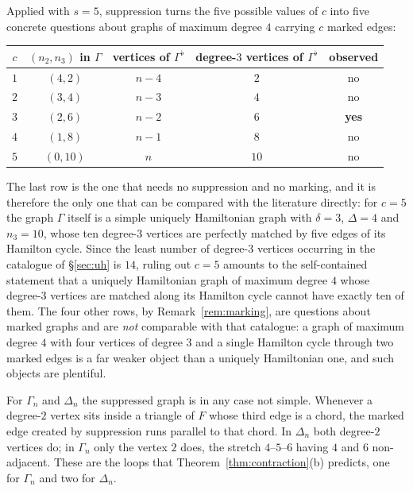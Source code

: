 \documentclass[11pt,a4paper]{article}
\theoremstyle{definition}
\theoremstyle{remark}
\begin{document}
Applied with $s=5$, suppression turns the five possible values of $c$ into five concrete questions about graphs of maximum degree $4$ carrying $c$ marked edges:
\begin{center}
\begin{tabular}{ccccc}
\toprule
$c$ & $(n_2,n_3)$ in $\Gamma$ & vertices of $\Gamma^{\flat}$ & degree-$3$ vertices of $\Gamma^{\flat}$ & observed \\
\midrule
$1$ & $(4,2)$  & $n-4$ & $2$  & no \\
$2$ & $(3,4)$  & $n-3$ & $4$  & no \\
$3$ & $(2,6)$  & $n-2$ & $6$  & \textbf{yes} \\
$4$ & $(1,8)$  & $n-1$ & $8$  & no \\
$5$ & $(0,10)$ & $n$   & $10$ & no \\
\bottomrule
\end{tabular}
\end{center}
The last row is the one that needs no suppression and no marking, and it is therefore the only one that can be compared with the literature directly: for $c=5$ the graph $\Gamma$ itself is a simple uniquely Hamiltonian graph with $\delta=3$, $\Delta=4$ and $n_3=10$, whose ten degree-$3$ vertices are perfectly matched by five edges of its Hamilton cycle. Since the least number of degree-$3$ vertices occurring in the catalogue of \S\ref{sec:uh} is $14$, ruling out $c=5$ amounts to the self-contained statement that a uniquely Hamiltonian graph of maximum degree $4$ whose degree-$3$ vertices are matched along its Hamilton cycle cannot have exactly ten of them. The four other rows, by Remark~\ref{rem:marking}, are questions about marked graphs and are \emph{not} comparable with that catalogue: a graph of maximum degree $4$ with four vertices of degree $3$ and a single Hamilton cycle through two marked edges is a far weaker object than a uniquely Hamiltonian one, and such objects are plentiful.

For $\Gamma_n$ and $\Delta_n$ the suppressed graph is in any case not simple. Whenever a degree-$2$ vertex sits inside a triangle of $F$ whose third edge is a chord, the marked edge created by suppression runs parallel to that chord. In $\Delta_n$ both degree-$2$ vertices do; in $\Gamma_n$ only the vertex $2$ does, the stretch $4$--$5$--$6$ having $4$ and $6$ non-adjacent. These are the loops that Theorem~\ref{thm:contraction}(b) predicts, one for $\Gamma_n$ and two for $\Delta_n$.
\end{document}
